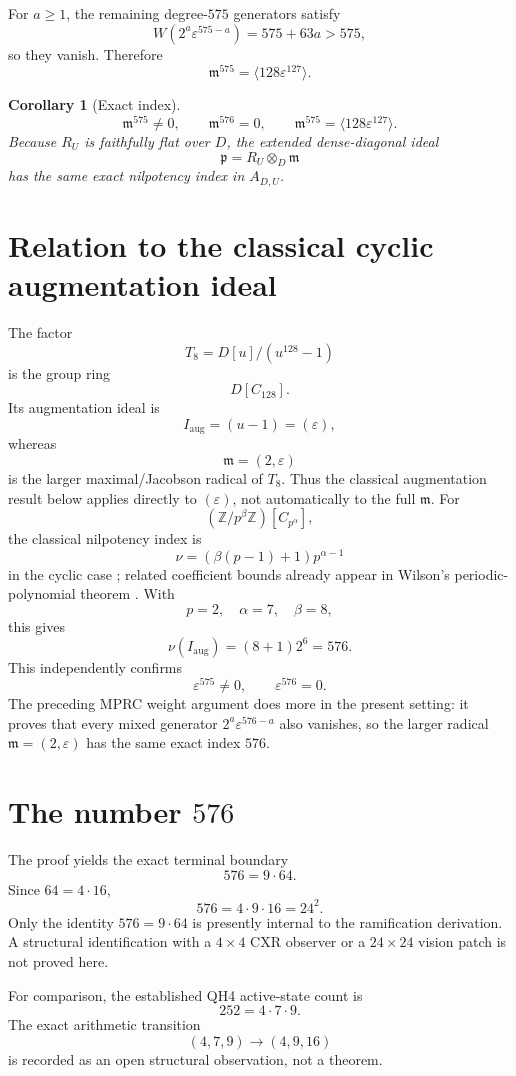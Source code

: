 \documentclass[11pt]{article}
\newtheorem{corollary}[theorem]{Corollary}
\theoremstyle{definition}
\newcommand{\Z}{\mathbb{Z}}
\begin{document}
For $a\ge1$, the remaining degree-$575$ generators satisfy
\[
W(2^a\varepsilon^{575-a})=575+63a>575,
\]
so they vanish. Therefore
\[
\mathfrak m^{575}=\langle128\varepsilon^{127}\rangle.
\]

\begin{corollary}[Exact index]
\[
\boxed{
\mathfrak m^{575}\ne0,\qquad
\mathfrak m^{576}=0,
\qquad
\mathfrak m^{575}=\langle128\varepsilon^{127}\rangle.
}
\]
Because $R_U$ is faithfully flat over $D$, the extended dense-diagonal ideal
\[
\mathfrak p=R_U\otimes_D\mathfrak m
\]
has the same exact nilpotency index in $A_{D,U}$.
\end{corollary}

\section{Relation to the classical cyclic augmentation ideal}
The factor
\[
T_8=D[u]/(u^{128}-1)
\]
is the group ring
\[
D[C_{128}].
\]
Its augmentation ideal is
\[
I_{\mathrm{aug}}=(u-1)=(\varepsilon),
\]
whereas
\[
\mathfrak m=(2,\varepsilon)
\]
is the larger maximal/Jacobson radical of $T_8$. Thus the classical augmentation result below applies directly to $(\varepsilon)$, not automatically to the full $\mathfrak m$. For
\[
(\Z/p^\beta\Z)[C_{p^\alpha}],
\]
the classical nilpotency index is
\[
\nu=(\beta(p-1)+1)p^{\alpha-1}
\]
in the cyclic case \cite{Schauz2021}; related coefficient bounds already appear in Wilson's periodic-polynomial theorem \cite{Wilson2006}. With
\[
p=2,\quad \alpha=7,\quad \beta=8,
\]
this gives
\[
\nu(I_{\mathrm{aug}})= (8+1)2^6=576.
\]
This independently confirms
\[
\varepsilon^{575}\ne0,\qquad \varepsilon^{576}=0.
\]
The preceding MPRC weight argument does more in the present setting: it proves that every mixed generator $2^a\varepsilon^{576-a}$ also vanishes, so the larger radical $\mathfrak m=(2,\varepsilon)$ has the same exact index $576$.

\section{The number $576$}
The proof yields the exact terminal boundary
\[
\boxed{
576=9\cdot64.
}
\]
Since $64=4\cdot16$,
\[
576=4\cdot9\cdot16=24^2.
\]
Only the identity $576=9\cdot64$ is presently internal to the ramification derivation. A structural identification with a $4\times4$ CXR observer or a $24\times24$ vision patch is not proved here.

For comparison, the established QH4 active-state count is
\[
252=4\cdot7\cdot9.
\]
The exact arithmetic transition
\[
(4,7,9)\to(4,9,16)
\]
is recorded as an open structural observation, not a theorem.
\end{document}
